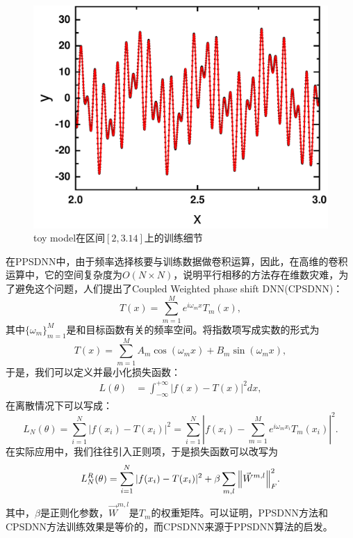 \begin{figure}[htbp]
  \centering
  \includegraphics[width=0.76\linewidth]{figures/toymodel/train3.pdf}
  \caption{toy model在区间$[2,3.14]$上的训练细节}
  \label{toy3}
\end{figure}
  


  在PPSDNN中，由于频率选择核要与训练数据做卷积运算，因此，在高维的卷积运算中，它的空间复杂度为$O (N\times N)$，说明平行相移的方法存在维数灾难，为了避免这个问题，人们提出了Coupled Weighted phase shift DNN\cite{cai2020phase}(CPSDNN)：
  \begin{equation} \label{eq:CPDNNcomplex}%
    T(x)=\sum_{m=1}^{M}e^{i\omega_{m}x}T_{m}(x),
    \end{equation}
    其中$\{\omega_{m}\}_{m=1}^M$是和目标函数有关的频率空间。将指数项写成实数的形式为
    \begin{equation}\label{eq:CPDNNreal}%
      T(x)=\sum_{m=1}^{M}A_{m}\cos(\omega_{m}x)+B_{m}\sin(\omega_{m}x),
      \end{equation}
    于是，我们可以定义并最小化损失函数：
    \begin{equation}
      \begin{aligned}
      L(\theta) &= \int_{-\infty}^{+\infty}|f(x)-T(x)|^2d x,\label{eq:2}%
      \end{aligned}
      \end{equation}
      在离散情况下可以写成：
      \begin{equation}
        L_N(\theta) = \sum_{i=1}^{N}\left\vert
        f(x_{i})-T(x_{i})\right\vert ^{2}
        =\sum_{i=1}^{N}\left\vert f(x_{i})-\sum_{m=1}^{M}e^{i\omega_{m}x_{i}}T_{m}(x_{i})\right\vert ^{2}. \label{eq:Ln2}%
        \end{equation}
在实际应用中，我们往往引入正则项，于是损失函数可以改写为
\begin{equation}
  L_N^R(\theta) = \sum_{i=1}^{N}|f(x_i) - T(x_i)|^2 + \beta \sum_{m,l} \norm{\vec{W}^{m, l}}_F^2.
  \end{equation}
  其中，$\beta$是正则化参数，$\vec{W}^{m, l}$是$T_m$的权重矩阵。可以证明，PPSDNN方法和CPSDNN方法训练效果是等价的，而CPSDNN来源于PPSDNN算法的启发。

